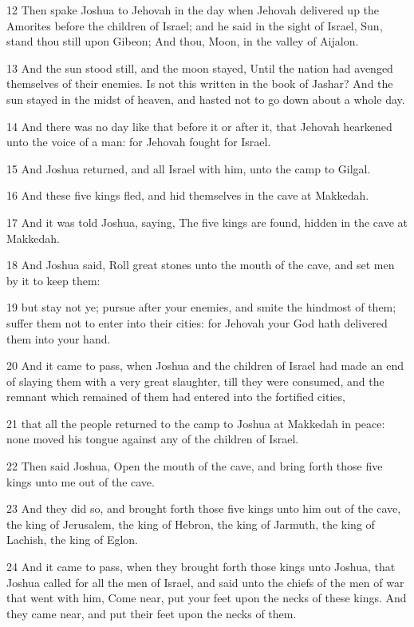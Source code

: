 \par 12 Then spake Joshua to Jehovah in the day when Jehovah delivered up the Amorites before the children of Israel; and he said in the sight of Israel, Sun, stand thou still upon Gibeon; And thou, Moon, in the valley of Aijalon.
\par 13 And the sun stood still, and the moon stayed, Until the nation had avenged themselves of their enemies. Is not this written in the book of Jashar? And the sun stayed in the midst of heaven, and hasted not to go down about a whole day.
\par 14 And there was no day like that before it or after it, that Jehovah hearkened unto the voice of a man: for Jehovah fought for Israel.
\par 15 And Joshua returned, and all Israel with him, unto the camp to Gilgal.
\par 16 And these five kings fled, and hid themselves in the cave at Makkedah.
\par 17 And it was told Joshua, saying, The five kings are found, hidden in the cave at Makkedah.
\par 18 And Joshua said, Roll great stones unto the mouth of the cave, and set men by it to keep them:
\par 19 but stay not ye; pursue after your enemies, and smite the hindmost of them; suffer them not to enter into their cities: for Jehovah your God hath delivered them into your hand.
\par 20 And it came to pass, when Joshua and the children of Israel had made an end of slaying them with a very great slaughter, till they were consumed, and the remnant which remained of them had entered into the fortified cities,
\par 21 that all the people returned to the camp to Joshua at Makkedah in peace: none moved his tongue against any of the children of Israel.
\par 22 Then said Joshua, Open the mouth of the cave, and bring forth those five kings unto me out of the cave.
\par 23 And they did so, and brought forth those five kings unto him out of the cave, the king of Jerusalem, the king of Hebron, the king of Jarmuth, the king of Lachish, the king of Eglon.
\par 24 And it came to pass, when they brought forth those kings unto Joshua, that Joshua called for all the men of Israel, and said unto the chiefs of the men of war that went with him, Come near, put your feet upon the necks of these kings. And they came near, and put their feet upon the necks of them.
